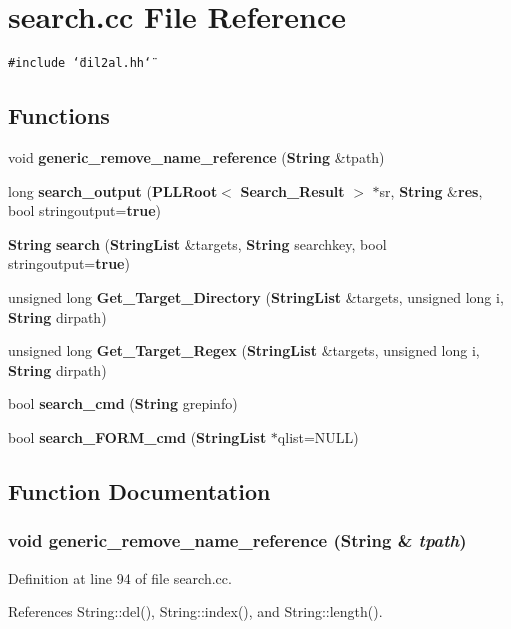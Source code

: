 \section{search.cc File Reference}
\label{search_8cc}
{\tt \#include \char`\"{}dil2al.hh\char`\"{}}\par
\subsection*{Functions}
\begin{CompactItemize}
\item 
void {\bf generic\_\-remove\_\-name\_\-reference} ({\bf String} \&tpath)
\item 
long {\bf search\_\-output} ({\bf PLLRoot}$<$ {\bf Search\_\-Result} $>$ $\ast$sr, {\bf String} \&{\bf res}, bool stringoutput={\bf true})
\item 
{\bf String} {\bf search} ({\bf String\-List} \&targets, {\bf String} searchkey, bool stringoutput={\bf true})
\item 
unsigned long {\bf Get\_\-Target\_\-Directory} ({\bf String\-List} \&targets, unsigned long i, {\bf String} dirpath)
\item 
unsigned long {\bf Get\_\-Target\_\-Regex} ({\bf String\-List} \&targets, unsigned long i, {\bf String} dirpath)
\item 
bool {\bf search\_\-cmd} ({\bf String} grepinfo)
\item 
bool {\bf search\_\-FORM\_\-cmd} ({\bf String\-List} $\ast$qlist=NULL)
\end{CompactItemize}


\subsection{Function Documentation}
\subsubsection{\setlength{\rightskip}{0pt plus 5cm}void generic\_\-remove\_\-name\_\-reference ({\bf String} \& {\em tpath})}\label{search_8cc_a0}




Definition at line 94 of file search.cc.

References String::del(), String::index(), and String::length().

